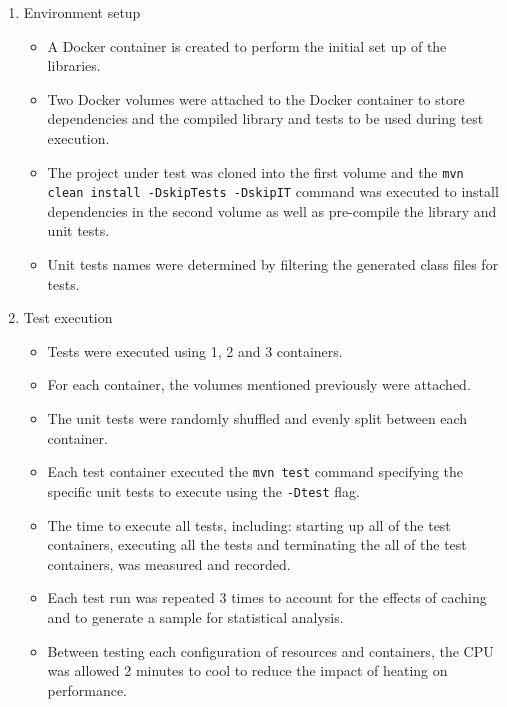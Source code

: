 \begin{enumerate}
\item Environment setup 
\begin{itemize}
        \item A Docker container is created to perform the initial set up of the libraries. 
        \item Two Docker volumes were attached to the Docker container to store dependencies and the compiled library and tests to be used during test execution. 
        \item The project under test was cloned into the first volume and the \texttt{mvn clean install {-}DskipTests {-}DskipIT} command was executed to install dependencies in the second volume as well as pre-compile the library and unit tests. 
        \item Unit tests names were determined by filtering the generated class files for tests. 
    \end{itemize}
\item Test execution 
\begin{itemize}
        \item Tests were executed using 1, 2 and 3 containers.
        \item For each container, the volumes mentioned previously were attached.
        \item The unit tests were randomly shuffled and evenly split between each container. 
        \item Each test container executed the \texttt{mvn test} command specifying the specific unit tests to execute using the \texttt{-Dtest} flag. 
        \item The time to execute all tests, including: starting up all of the test containers, executing all the tests and terminating the all of the test containers, was measured and recorded. 
        \item Each test run was repeated 3 times to account for the effects of caching and to generate a sample for statistical analysis. 
        \item Between testing each configuration of resources and containers, the CPU was allowed 2 minutes to cool to reduce the impact of heating on performance. 
    \end{itemize}
\end{enumerate}

